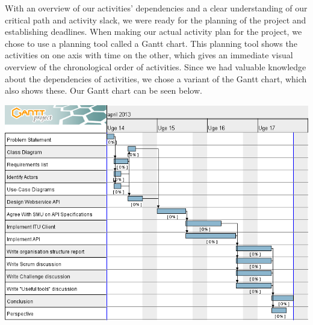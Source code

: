 With an overview of our activities’ dependencies and a clear understanding of our critical path and activity slack, we were ready for the planning of the project and establishing deadlines. 
When making our actual activity plan for the project, we chose to use a planning tool called a Gantt chart. This planning tool shows the activities on one axis with time on the other, which gives an immediate visual overview of the chronological order of activities. Since we had valuable knowledge about the dependencies of activities, we chose a variant of the Gantt chart, which also shows these.
Our Gantt chart can be seen below.  

\includegraphics[scale=0.5]{./Empiri/Planning/img/gantt-chart.png}

